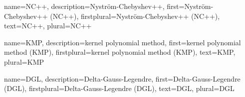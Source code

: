 {%
  name={NC++},%
  description={Nystr\"om-Chebyshev++},%
  first={Nystr\"om-Chebyshev++ (NC++)},%
  firstplural={Nystr\"om-Chebyshev++ (NC++)},%
  text={NC++},%
  plural={NC++}%
}

{%
  name={KMP},%
  description={kernel polynomial method},%
  first={kernel polynomial method (KMP)},%
  firstplural={kernel polynomial method (KMP)},%
  text={KMP},%
  plural={KMP}%
}

{%
  name={DGL},%
  description={Delta-Gauss-Legendre},%
  first={Delta-Gauss-Legendre (DGL)},%
  firstplural={Delta-Gauss-Legendre (DGL)},%
  text={DGL},%
  plural={DGL}%
}
